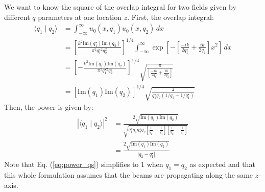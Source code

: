 We want to know the square of the overlap integral for two fields
given by different $q$ parameters at one location $z$. First, the
overlap integral:
\begin{align}
\langle q_1 \mid q_2 \rangle &= \int_{-\infty}^\infty u_0(x, q_1) u_0(x, q_2) \, dx \\
 &= \left[ \frac{k^2 \mathrm{Im}(q^\star_1) \mathrm{Im}(q_2)}{\pi^2 q^{\star 2}_1 q^2_2} \right]^{1/4} 
 \int_{-\infty}^\infty \exp{\left[ -\left[ \frac{-i k}{2 q^\star_1} + \frac{i k}{2 q_2} \right]x^2 \right]} \, dx \\
 &= \left[ -\frac{k^2 \mathrm{Im}(q_1) \mathrm{Im}(q_2)}{\pi^2
     q^{\star 2}_1 q^2_2} \right]^{1/4} \sqrt{\frac{\pi}{\left[ \frac{-i k}{2 q^\star_1} + \frac{i k}{2 q_2}
   \right]}} \\
 &= \left[ \mathrm{Im}(q_1) \mathrm{Im}(q_2) \right]^{1/4}
 \sqrt{\frac{2}{q^\star_1 q_2 \left( 1/q_2 - 1/q^\star_1 \right)}} 
\end{align}
Then, the power is given by:
\begin{align}
\left| \langle q_1 \mid q_2 \rangle \right|^2
&= \frac{2 \sqrt{\mathrm{Im}(q_1) \mathrm{Im}(q_2)}}  
{\sqrt{q^\star_1 q_1 q^\star_2 q_2 \left[\frac{1}{q_2} - \frac{1}{q^\star_1} \right]
    \left[\frac{1}{q^\star_2} - \frac{1}{q_1} \right]}} \\
&= \frac{2 \sqrt{\mathrm{Im}(q_1) \mathrm{Im}(q_2)}}{|q_2 - q^\star_1 |} 
\label{eq:power_qs}
\end{align}
Note that Eq. (\ref{eq:power_qs}) simplifies to 1 when $q_1 = q_2$ as
expected and that this whole formulation assumes that the beams are
propagating along the same $z$-axis.

